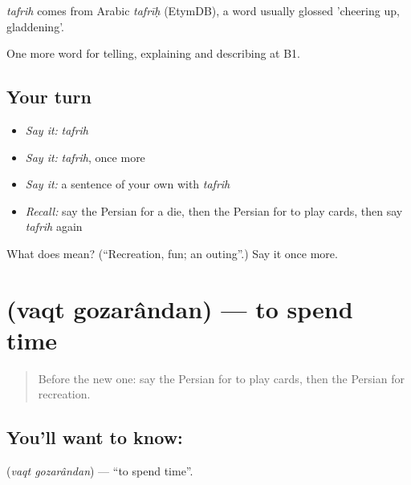 \begin{cousinweb}
\emph{tafrih} comes from Arabic \emph{tafrīḥ} (EtymDB), a word usually glossed 'cheering up, gladdening'.
\end{cousinweb}

\begin{grammarlens}[title={What you've built}]
One more word for telling, explaining and describing at B1.
\end{grammarlens}

\subsection*{Your turn}
\begin{itemize}
\raggedright
  \item \emph{Say it:} \emph{tafrih}
  \item \emph{Say it:} \emph{tafrih}, once more
  \item \emph{Say it:} a sentence of your own with \emph{tafrih}
  \item \emph{Recall:} say the Persian for a die, then the Persian for to play cards, then say \emph{tafrih} again
\end{itemize}

\begin{tcolorbox}[breakable,colback=teal!4,colframe=teal!35!black,title={Before you move on}]
What does  mean? (\textquotedblleft{}Recreation, fun; an outing\textquotedblright{}.) Say it once more.
\end{tcolorbox}
\section[\texorpdfstring{\fa{وقت} \fa{گذراندن} (vaqt gozarândan)}{وقت گذراندن (vaqt gozarândan)}]{  (vaqt gozarândan) — to spend time}

\label{lesson:FA-C510-vaqt-gozarandan}



\begin{quote}
Before the new one: say the Persian for to play cards, then the Persian for recreation.
\end{quote}

\subsection*{You'll want to know:  }
\textbf{ } (\emph{vaqt gozarândan}) — \textquotedblleft{}to spend time\textquotedblright{}.

